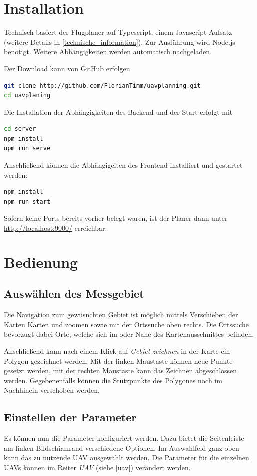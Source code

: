 \documentclass[a4paper,12pt,bibliography=totoc, listof=totoc,titlepage]{scrartcl}
\begin{document}
\section{Installation}
Technisch basiert der Flugplaner auf Typescript, einem Javascript-Aufsatz (weitere Details in \autoref{technische_information}). Zur Ausführung wird Node.js benötigt. Weitere Abhängigkeiten werden automatisch nachgeladen.

Der Download kann von GitHub erfolgen
\begin{lstlisting}[language=bash]
git clone http://github.com/FlorianTimm/uavplanning.git
cd uavplaning
\end{lstlisting}

Die Installation der Abhängigkeiten des Backend und der Start erfolgt mit
\begin{lstlisting}[language=bash]
cd server
npm install
npm run serve
\end{lstlisting}

Anschließend können die Abhängigeiten des Frontend installiert und gestartet werden:
\begin{lstlisting}[language=bash]
npm install
npm run start
\end{lstlisting}

Sofern keine Ports bereits vorher belegt waren, ist der Planer dann unter \url{http://localhost:9000/} erreichbar.

\section{Bedienung}

\subsection{Auswählen des Messgebiet}
Die Navigation zum gewüsnchten Gebiet ist möglich mittels Verschieben der Karten Karten und zoomen sowie mit der Ortssuche oben rechts. Die Ortssuche bevorzugt dabei Orte, welche sich im oder Nahe des Kartenausschnittes befinden.

Anschließend kann nach einem Klick auf \textit{Gebiet zeichnen} in der Karte ein Polygon gezeichnet werden. Mit der linken Maustaste können neue Punkte gesetzt werden, mit der rechten Maustaste kann das Zeichnen abgeschlossen werden. Gegebenenfalls können die Stützpunkte des Polygones noch im Nachhinein verschoben werden.

\subsection{Einstellen der Parameter}
Es können nun die Parameter konfiguriert werden. Dazu bietet die Seitenleiste am linken Bildschirmrand verschiedene Optionen. Im Auswahlfeld ganz oben kann das zu nutzende UAV ausgewählt werden. Die Parameter für die einzelnen UAVs können im Reiter \textit{UAV} (siehe \autoref{uav}) verändert werden.
\end{document}
